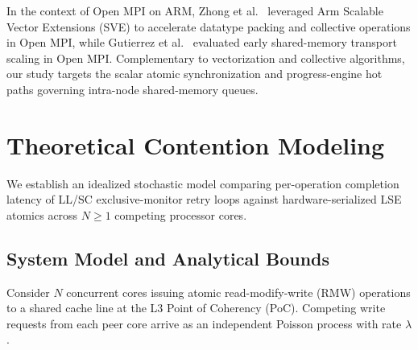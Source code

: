 \documentclass[conference]{IEEEtran}
\begin{document}
In the context of Open MPI on ARM, Zhong et al.~\cite{zhong2020sve} leveraged Arm Scalable Vector Extensions (SVE) to accelerate datatype packing and collective operations in Open MPI, while Gutierrez et al.~\cite{gutierrez2012cray} evaluated early shared-memory transport scaling in Open MPI. Complementary to vectorization and collective algorithms, our study targets the scalar atomic synchronization and progress-engine hot paths governing intra-node shared-memory queues.

\section{Theoretical Contention Modeling}
We establish an idealized stochastic model comparing per-operation completion latency of LL/SC exclusive-monitor retry loops against hardware-serialized LSE atomics across $N \ge 1$ competing processor cores.

\subsection{System Model and Analytical Bounds}
Consider $N$ concurrent cores issuing atomic read-modify-write (RMW) operations to a shared cache line at the L3 Point of Coherency (PoC). Competing write requests from each peer core arrive as an independent Poisson process with rate $\lambda$.
\end{document}
